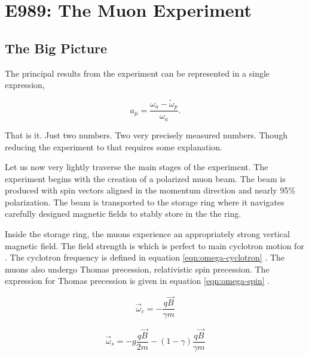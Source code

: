 \chapter {E989: The Muon \gmtwo Experiment}

\section{The Big Picture} \label{sec:expt-big-picture}

The principal results from the \gmtwo experiment can be represented in a single expression,

\begin{equation}
\label{eqn:gm2-results}
a_\mu = \frac{\omega_a - \tilde{\omega}_p}{\omega_a}.
\end{equation}

\noindent 
That is it.  Just two numbers. Two very precisely measured numbers.  Though reducing the experiment to that requires some explanation.  

Let us now very lightly traverse the main stages of the experiment.  The experiment begins with the creation of a polarized muon beam.  The beam is produced with spin vectors aligned in the momentum direction and nearly 95\% polarization.  The beam is transported to the \gmtwo storage ring where it navigates carefully designed magnetic fields to stably store in the the ring.


Inside the storage ring, the muons experience an appropriately strong vertical magnetic field.  The field strength is \bmagic which is perfect to main cyclotron motion for \pmagic.  The cyclotron frequency is defined in equation \ref{eqn:omega-cyclotron} \cite{e821-prd}.  The muons also undergo Thomas precession, relativistic spin precession.  The expression for Thomas precession is given in equation \ref{eqn:omega-spin} \cite{e821-prd}.

\begin{equation}
\label{eqn:omega-cyclotron}
\vec{\omega}_c = -\frac{q \vec{B}}{\gamma m}
\end{equation}

\begin{equation}
\label{eqn:omega-spin}
\vec{\omega}_s = -g\frac{q \vec{B}}{2 m} - (1 - \gamma) \frac{q \vec{B}}{\gamma m}
\end{equation}

